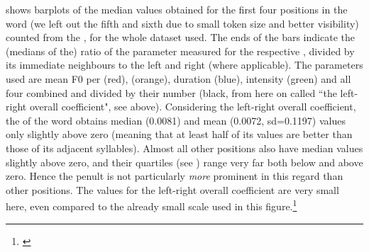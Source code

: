 \documentclass[output=paper]{LSP/langsci}
\begin{document}
 shows barplots of the median values obtained for the first four  positions in the word (we left out the fifth and sixth due to small token size and better visibility) counted from the , for the whole dataset used. The ends of the bars indicate the (medians of the) ratio of the parameter measured for the respective , divided by its immediate neighbours to the left and right (where applicable). The parameters used are mean F0 per  (red),  (orange), duration (blue), intensity (green) and all four combined and divided by their number (black, from here on called ``the left-right overall coefficient", see above). Considering the left-right overall coefficient, the  of the word obtains median (0.0081) and mean (0.0072, sd=0.1197) values only slightly above zero (meaning that at least half of its values are better than those of its adjacent syllables). Almost all other  positions also have median values slightly above zero, and their quartiles (see ) range very far both below and above zero. Hence the penult is not particularly \textit{more} prominent in this regard than other positions. The values for the left-right overall coefficient are very small here, even compared to the already small scale used in this figure.\footnote{%
\begin{samepage}

\end{samepage}}
\end{document}
